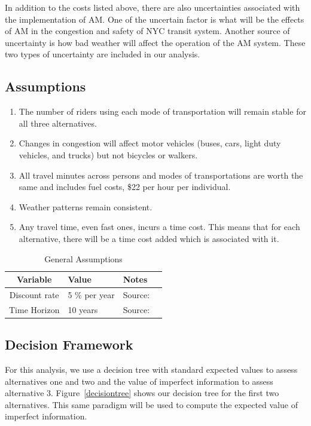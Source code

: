 \documentclass[11pt, letterpaper]{article}
\begin{document}
In addition to the costs listed above, there are also uncertainties associated 
with the implementation of AM. One of the uncertain factor is what will be the effects
of AM in the congestion and safety of NYC transit system. Another source of 
uncertainty is how bad weather will affect the operation of the AM system. These two
types of uncertainty are included in our analysis.

\subsection{Assumptions}

\begin{enumerate}[leftmargin=*]
\item The number of riders using each mode of transportation will remain
  stable for all three alternatives.
\item Changes in congestion will affect motor vehicles (buses, cars,
  light duty vehicles, and trucks) but not bicycles or walkers.
\item All travel minutes across persons and modes of transportations
  are worth the same and includes fuel costs, \$22 per hour per individual.
\item Weather patterns remain consistent.
\item Any travel time, even fast ones, incurs a time cost.  This means
  that for each alternative, there will be a time cost added which is
  associated with it.
\end{enumerate}

\begin{table}[h]
\caption{General Assumptions}
\centering
\renewcommand{\arraystretch}{1.1}
\begin{tabular}{c l l l}
\hline
Variable 							& Value 				& Notes 			\\\hline\hline
Discount rate						& 5 \% per year			& Source:			\\
Time Horizon						& 10 years			& Source:			\\\hline
\end{tabular}
\label{tab:assumptions}
\end{table}%

\subsection{Decision Framework}

For this analysis, we use a decision tree with standard expected
values to assess alternatives one and two and the value of imperfect
information to assess alternative 3.  Figure~\ref{decisiontree} shows
our decision tree for the first two alternatives.  This same paradigm
will be used to compute the expected value of imperfect information.
\end{document}
